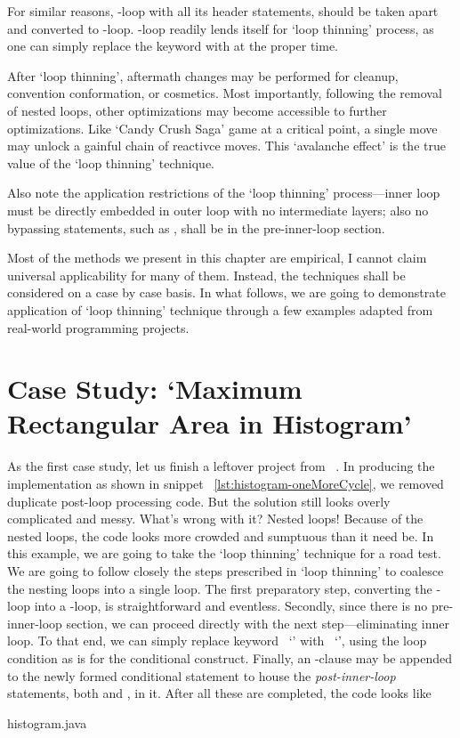 For similar reasons, -loop with all its header statements, should be taken apart and
converted to -loop.
-loop readily lends itself for `loop thinning' process, as one can
simply replace the keyword  with  at the proper time.


After `loop thinning',
aftermath changes may be performed for cleanup, convention conformation, or cosmetics.
Most importantly, following the removal of nested loops, other optimizations may become
accessible to further optimizations.
Like `Candy Crush Saga' game at a critical point, a single move may unlock a
gainful chain of reactivce moves.
This `avalanche effect' is the true value of the `loop thinning' technique.


Also note the application restrictions of the `loop thinning' process---inner loop must be directly
embedded in
outer loop with no intermediate layers;
also no bypassing statements, such as , shall be in the pre-inner-loop section.


Most of the methods we present in this chapter are empirical, I cannot claim
universal applicability for many of them.
Instead, the techniques shall be considered on a case by case basis.
In what follows, we are going to demonstrate application of `loop thinning' technique through
a few examples adapted from real-world programming projects.


\section{Case Study: `Maximum Rectangular Area in Histogram'}
\label{sec:nested-loop-histogram}

As the first case study, let us finish a leftover project from ~.
In producing the implementation as shown in snippet ~\autoref{lst:histogram-oneMoreCycle},
we removed duplicate post-loop processing code.
But the solution still looks overly complicated and messy.
What's wrong with it?
Nested loops!
Because of the nested loops, the code looks more crowded and sumptuous than it need be.
In this example, we are going to take the `loop thinning' technique for a road test.
We are going to follow closely the steps prescribed in `loop thinning' to coalesce the
nesting loops into a single loop.
The first preparatory step, converting the -loop into a -loop, is
straightforward and eventless.
Secondly, since there is no pre-inner-loop section, we can proceed directly with the next
step---eliminating inner loop.
To that end, we can simply replace keyword ~`' with ~`', using the loop
condition as is for the conditional construct.
Finally, an -clause may be appended to the newly formed conditional statement to
house the \emph{post-inner-loop} statements, both  and , in it.
After all these are completed, the code looks like

{histogram.java}


